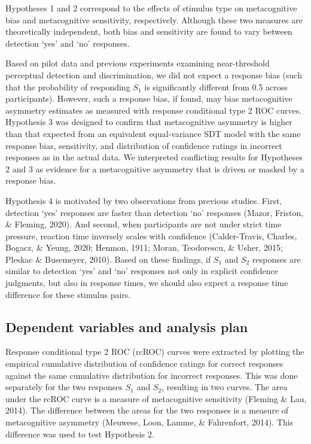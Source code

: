 \documentclass[12pt,twoside]{reedthesis}
\begin{document}
Hypotheses 1 and 2 correspond to the effects of stimulus type on metacognitive bias and metacognitive sensitivity, respectively. Although these two measures are theoretically independent, both bias and sensitivity are found to vary between detection `yes' and `no' responses.

Based on pilot data and previous experiments examining near-threshold perceptual detection and discrimination, we did not expect a response bias (such that the probability of responding \(S_1\) is significantly different from 0.5 across participants). However, such a response bias, if found, may bias metacognitive asymmetry estimates as measured with response conditional type 2 ROC curves. Hypothesis 3 was designed to confirm that metacognitive asymmetry is higher than that expected from an equivalent equal-variance SDT model with the same response bias, sensitivity, and distribution of confidence ratings in incorrect responses as in the actual data. We interpreted conflicting results for Hypotheses 2 and 3 as evidence for a metacognitive asymmetry that is driven or masked by a response bias.

Hypothesis 4 is motivated by two observations from previous studies. First, detection `yes' responses are faster than detection `no' responses (Mazor, Friston, \& Fleming, 2020). And second, when participants are not under strict time pressure, reaction time inversely scales with confidence (Calder-Travis, Charles, Bogacz, \& Yeung, 2020; Henmon, 1911; Moran, Teodorescu, \& Usher, 2015; Pleskac \& Busemeyer, 2010). Based on these findings, if \(S_1\) and \(S_2\) responses are similar to detection `yes' and `no' responses not only in explicit confidence judgments, but also in response times, we should also expect a response time difference for these stimulus pairs.

\hypertarget{analysis-plan}{%
\subsection{Dependent variables and analysis plan}\label{analysis-plan}}

Response conditional type 2 ROC (rcROC) curves were extracted by plotting the empirical cumulative distribution of confidence ratings for correct responses against the same cumulative distribution for incorrect responses. This was done separately for the two responses \(S_1\) and \(S_2\), resulting in two curves. The area under the rcROC curve is a measure of metacognitive sensitivity (Fleming \& Lau, 2014). The difference between the areas for the two responses is a measure of metacognitive asymmetry (Meuwese, Loon, Lamme, \& Fahrenfort, 2014). This difference was used to test Hypothesis 2.
\end{document}
